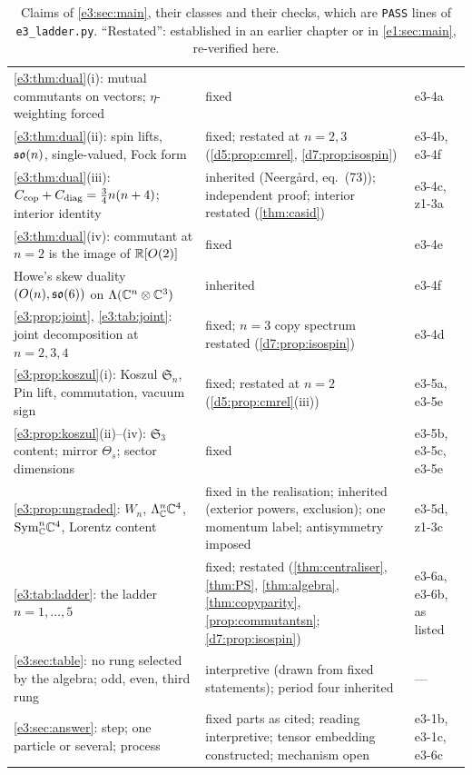 \begin{table}[!htbp]
\begin{tabular}{@{}>{\raggedright\arraybackslash}p{8.2cm}>{\raggedright\arraybackslash}p{4.5cm}>{\raggedright\arraybackslash}p{2.2cm}@{}}
\cref{e3:thm:dual}(i): mutual commutants on vectors; $\eta$-weighting forced & fixed & e3-4a\\
\cref{e3:thm:dual}(ii): spin lifts, $\mathfrak{so}(n)$, single-valued, Fock form & fixed; restated at $n=2,3$ (\cref{d5:prop:cmrel}, \cref{d7:prop:isospin}) & e3-4b, e3-4f\\
\cref{e3:thm:dual}(iii): $C_{\rm cop}+C_{\rm diag}=\tfrac34n(n+4)$; interior identity & inherited (Neerg{\aa}rd, eq.~(73)); independent proof; interior restated (\cref{thm:casid}) & e3-4c, z1-3a\\
\cref{e3:thm:dual}(iv): commutant at $n=2$ is the image of $\mathbb{R}[O(2)]$ & fixed & e3-4e\\
Howe's skew duality $(O(n),\mathfrak{so}(6))$ on $\Lambda(\mathbb{C}^n\otimes\mathbb{C}^3)$ & inherited \cite{Howe89} & e3-4f\\
\cref{e3:prop:joint}, \cref{e3:tab:joint}: joint decomposition at $n=2,3,4$ & fixed; $n=3$ copy spectrum restated (\cref{d7:prop:isospin}) & e3-4d\\
\cref{e3:prop:koszul}(i): Koszul $\mathfrak S_n$, Pin lift, commutation, vacuum sign & fixed; restated at $n=2$ (\cref{d5:prop:cmrel}(iii)) & e3-5a, e3-5e\\
\cref{e3:prop:koszul}(ii)--(iv): $\mathfrak S_3$ content; mirror $\Theta_s$; sector dimensions & fixed & e3-5b, e3-5c, e3-5e\\
\cref{e3:prop:ungraded}: $W_n$, $\Lambda^n_{\mathbb{C}}\mathbb{C}^4$, $\mathrm{Sym}^n_{\mathbb{C}}\mathbb{C}^4$, Lorentz content & fixed in the realisation; inherited (exterior powers, exclusion); one momentum label; antisymmetry imposed & e3-5d, z1-3c\\
\cref{e3:tab:ladder}: the ladder $n=1,\dots,5$ & fixed; restated (\cref{thm:centraliser}, \cref{thm:PS}, \cref{thm:algebra}, \cref{thm:copyparity}, \cref{prop:commutantsn}; \cref{d7:prop:isospin}) & e3-6a, e3-6b, as listed\\
\cref{e3:sec:table}: no rung selected by the algebra; odd, even, third rung & interpretive (drawn from fixed statements); period four inherited & ---\\
\cref{e3:sec:answer}: step; one particle or several; process & fixed parts as cited; reading interpretive; tensor embedding constructed; mechanism open & e3-1b, e3-1c, e3-6c\\
\bottomrule
\end{tabular}
\caption{Claims of \cref{e3:sec:main}, their classes and their checks, which are \texttt{PASS} lines of \texttt{e3\_ladder.py}.
``Restated'': established in an earlier chapter or in \cref{e1:sec:main}, re-verified here.}
\label{e3:tab:claims}
\end{table}

